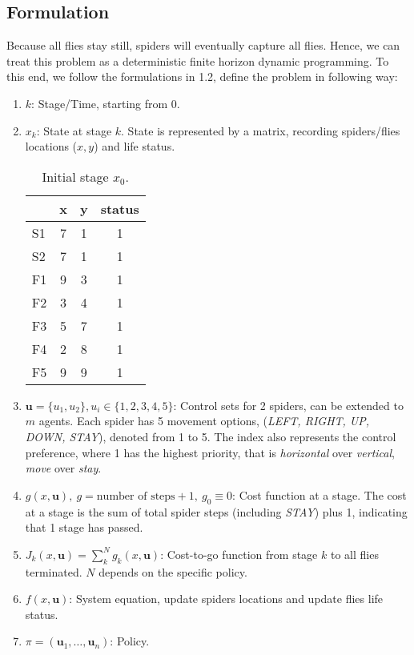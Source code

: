 \documentclass[11pt]{article}
\newcommand{\sample}[1]{#1_1 , \dots , #1_n}
\begin{document}
\subsection*{Formulation}
Because all flies stay still, spiders will eventually capture all flies. Hence, we can treat this problem as a deterministic finite horizon dynamic programming. To this end, we follow the formulations in 1.2, define the problem in following way:
\begin{enumerate}
    \item $k$: Stage/Time, starting from 0.
    \item $x_k$: State at stage $k$. State is represented by a matrix, recording spiders/flies locations ($x, y$) and life status.
    \begin{table}[h]
    \centering
\begin{tabular}{lccc}
\hline
   & \textbf{x} & \textbf{y} & \textbf{status} \\ \hline
S1 & 7          & 1          & 1               \\
S2 & 7          & 1          & 1               \\
F1 & 9          & 3          & 1               \\
F2 & 3          & 4          & 1               \\
F3 & 5          & 7          & 1               \\
F4 & 2          & 8          & 1               \\
F5 & 9          & 9          & 1      \\
\hline
\end{tabular}
\caption{Initial stage $x_0$.}
\end{table}

    \item $\boldsymbol u = \{u_1, u_2\}, u_i \in \{1, 2, 3, 4, 5\}$: Control sets for 2 spiders, can be extended to $m$ agents. Each spider has 5 movement options, (\emph{LEFT, RIGHT, UP, DOWN, STAY}), denoted from 1 to 5. The index also represents the control preference, where 1 has the highest priority, that is \emph{horizontal} over \emph{vertical}, \emph{move} over \emph{stay}.
    \item $g(x, \boldsymbol u), ~g = \text{number of steps} + 1, ~g_0 \equiv 0$: Cost function at a stage. The cost at a stage is the sum of total spider steps (including \emph{STAY}) plus 1, indicating that 1 stage has passed.
    \item $J_k(x, \boldsymbol u) = \sum _k^N g_k(x, \boldsymbol u)$: Cost-to-go function from stage $k$ to all flies terminated. $N$ depends on the specific policy.
    \item $f(x, \boldsymbol u)$: System equation, update spiders locations and update flies life status.
    \item $\pi = (\sample{\boldsymbol u})$: Policy.
\end{enumerate}
\end{document}
